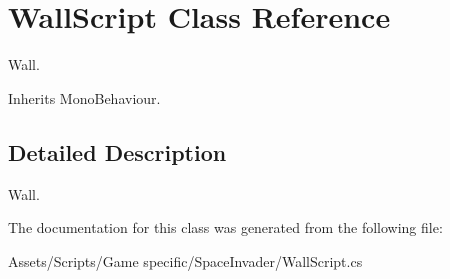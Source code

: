 \hypertarget{class_wall_script}{\section{Wall\-Script Class Reference}
\label{class_wall_script}
}


Wall. 




Inherits Mono\-Behaviour.



\subsection{Detailed Description}
Wall.



The documentation for this class was generated from the following file\-:\begin{DoxyCompactItemize}
\item 
Assets/\-Scripts/\-Game specific/\-Space\-Invader/Wall\-Script.\-cs\end{DoxyCompactItemize}
